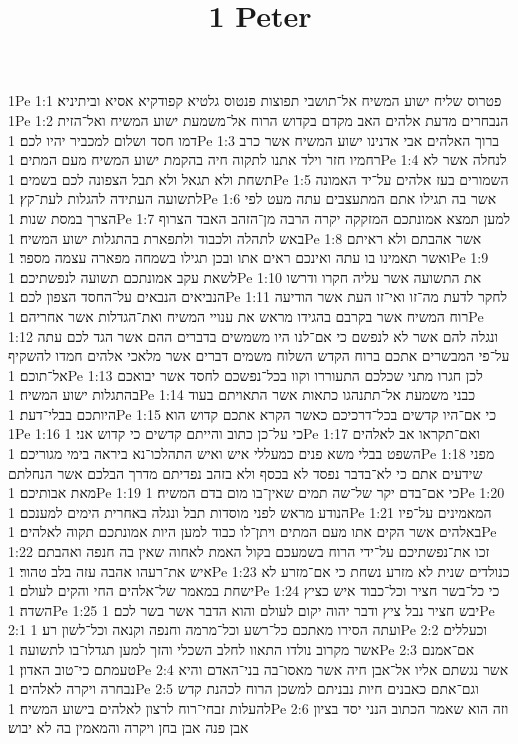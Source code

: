 

\title{1 Peter}

1Pe 1:1  פטרוס שליח ישוע המשיח אל־תושבי תפוצות פנטוס גלטיא קפודקיא אסיא וביתיניא׃
1Pe 1:2  הנבחרים מדעת אלהים האב מקדם בקדוש הרוח אל־משמעת ישוע המשיח ואל־הזית דמו חסד ושלום למכביר יהיו לכם׃
1Pe 1:3  ברוך האלהים אבי אדנינו ישוע המשיח אשר כרב רחמיו חזר וילד אתנו לתקוה חיה בהקמת ישוע המשיח מעם המתים׃
1Pe 1:4  לנחלה אשר לא תשחת ולא תגאל ולא תבל הצפונה לכם בשמים׃
1Pe 1:5  השמורים בעז אלהים על־יד האמונה לתשועה העתידה להגלות לעת־קץ׃
1Pe 1:6  אשר בה תגילו אתם המתעצבים עתה מעט לפי הצרך במסת שנות׃
1Pe 1:7  למען תמצא אמונתכם המזקקה יקרה הרבה מן־הזהב האבד הצרוף באש לתהלה ולכבוד ולתפארת בהתגלות ישוע המשיח׃
1Pe 1:8  אשר אהבתם ולא ראיתם ואשר תאמינו בו עתה ואינכם ראים אתו ובכן תגילו בשמחה מפארה עצמה מספר׃
1Pe 1:9  לשאת עקב אמונתכם תשועה לנפשתיכם׃
1Pe 1:10  את התשועה אשר עליה חקרו ודרשו הנביאים הנבאים על־החסד הצפון לכם׃
1Pe 1:11  לחקר לדעת מה־זו ואי־זו העת אשר הודיעה רוח המשיח אשר בקרבם בהגידו מראש את ענויי המשיח ואת־הגדלות אשר אחריהם׃
1Pe 1:12  ונגלה להם אשר לא לנפשם כי אם־לנו היו משמשים בדברים ההם אשר הגד לכם עתה על־פי המבשרים אתכם ברוח הקדש השלוח משמים דברים אשר מלאכי אלהים חמדו להשקיף אל־תוכם׃
1Pe 1:13  לכן חגרו מתני שכלכם התעוררו וקוו בכל־נפשכם לחסד אשר יבואכם בהתגלות ישוע המשיח׃
1Pe 1:14  כבני משמעת אל־תתנהגו כתאות אשר התאויתם בעוד היותכם בבלי־דעת׃
1Pe 1:15  כי אם־היו קדשים בכל־דרכיכם כאשר הקרא אתכם קדוש הוא׃
1Pe 1:16  כי על־כן כתוב והייתם קדשים כי קדוש אני׃
1Pe 1:17  ואם־תקראו אב לאלהים השפט בבלי משא פנים כמעללי איש ואיש התהלכו־נא ביראה בימי מגוריכם׃
1Pe 1:18  מפני שידעים אתם כי לא־בדבר נפסד לא בכסף ולא בזהב נפדיתם מדרך הבלכם אשר הנחלתם מאת אבותיכם׃
1Pe 1:19  כי אם־בדם יקר של־שה תמים שאין־בו מום בדם המשיח׃
1Pe 1:20  הנודע מראש לפני מוסדות תבל ונגלה באחרית הימים למענכם׃
1Pe 1:21  המאמינים על־פיו באלהים אשר הקים אתו מעם המתים ויתן־לו כבוד למען היות אמונתכם תקוה לאלהים׃
1Pe 1:22  זכו את־נפשתיכם על־ידי הרוח בשמעכם בקול האמת לאחוה שאין בה חנפה ואהבתם איש את־רעהו אהבה עזה בלב טהור׃
1Pe 1:23  כנולדים שנית לא מזרע נשחת כי אם־מזרע לא ישחת במאמר של־אלהים החי והקים לעולם׃
1Pe 1:24  כי כל־בשר חציר וכל־כבוד איש כציץ השדה׃
1Pe 1:25  יבש חציר נבל ציץ ודבר יהוה יקום לעולם והוא הדבר אשר בשר לכם׃
1Pe 2:1  ועתה הסירו מאתכם כל־רשע וכל־מרמה וחנפה וקנאה וכל־לשון רע׃
1Pe 2:2  וכעללים אשר מקרוב נולדו התאוו לחלב השכלי והזך למען תגדלו־בו לתשועה׃
1Pe 2:3  אם־אמנם טעמתם כי־טוב האדון׃
1Pe 2:4  אשר נגשתם אליו אל־אבן חיה אשר מאסו־בה בני־האדם והיא נבחרה ויקרה לאלהים׃
1Pe 2:5  וגם־אתם כאבנים חיות נבניתם למשכן הרוח לכהנת קדש להעלות זבחי־רוח לרצון לאלהים בישוע המשיח׃
1Pe 2:6  וזה הוא שאמר הכתוב הנני יסד בציון אבן פנה אבן בחן ויקרה והמאמין בה לא יבוש׃
